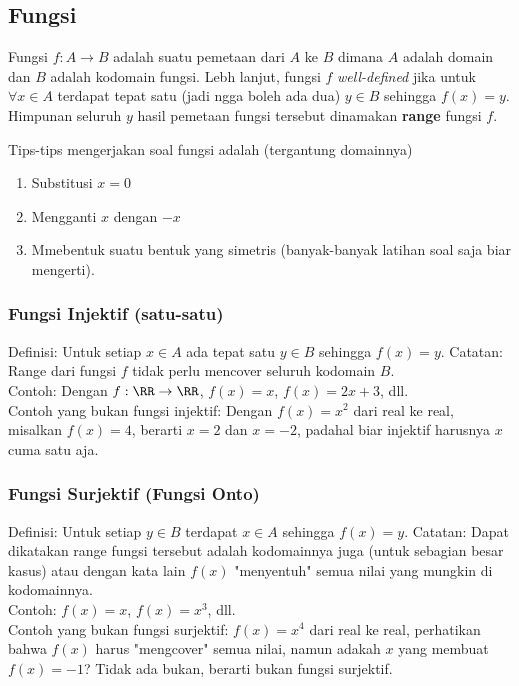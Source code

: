 \subsection{Fungsi}
Fungsi $f : A \rightarrow B$ adalah suatu pemetaan dari $A$ ke $B$ dimana $A$ adalah domain dan $B$ adalah kodomain fungsi. Lebh lanjut, fungsi $f$ \textit{well-defined} jika untuk $\forall x \in A$ terdapat tepat satu (jadi ngga boleh ada dua) $y \in B$ sehingga $f(x)=y$. Himpunan seluruh $y$ hasil pemetaan fungsi tersebut dinamakan \textbf{range} fungsi $f$.

Tips-tips mengerjakan soal fungsi adalah (tergantung domainnya)
\begin{enumerate}
\item Substitusi $x=0$
\item Mengganti $x$ dengan $-x$
\item Mmebentuk suatu bentuk yang simetris (banyak-banyak latihan soal saja biar mengerti).
\end{enumerate}

\subsubsection{Fungsi Injektif (satu-satu)}
Definisi: Untuk setiap $x \in A$ ada tepat satu $y \in B$ sehingga $f(x)=y$. 
Catatan: Range dari fungsi $f$ tidak perlu mencover seluruh kodomain $B$.\\
Contoh: Dengan $f: \RR \rightarrow \RR$, $f(x)=x$, $f(x)=2x+3$, dll.\\ 
Contoh yang bukan fungsi injektif: Dengan $f(x)=x^2$ dari real ke real, misalkan $f(x)=4$, berarti $x=2$ dan $x=-2$, padahal biar injektif harusnya $x$ cuma satu aja.

\subsubsection{Fungsi Surjektif (Fungsi Onto)}
Definisi: Untuk setiap $y \in B$ terdapat $x \in A$ sehingga $f(x)=y$. 
Catatan: Dapat dikatakan range fungsi tersebut adalah kodomainnya juga (untuk sebagian besar kasus) atau dengan kata lain $f(x)$ "menyentuh" semua nilai yang mungkin di kodomainnya. \\
Contoh: $f(x)=x$, $f(x)=x^3$, dll.\\
Contoh yang bukan fungsi surjektif: $f(x)=x^4$ dari real ke real, perhatikan bahwa $f(x)$ harus "mengcover" semua nilai, namun adakah $x$ yang membuat $f(x)=-1$? Tidak ada bukan, berarti bukan fungsi surjektif.

